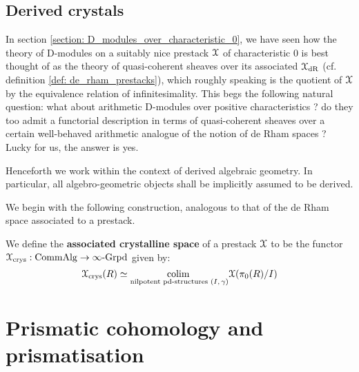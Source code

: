     \subsection{Derived crystals}
        In section \ref{section: D_modules_over_characteristic_0}, we have seen how the theory of D-modules on a suitably nice prestack $\mathcal{X}$ of characteristic $0$ is best thought of as the theory of quasi-coherent sheaves over its associated  $\mathcal{X}_{\mathrm{dR}}$ (cf. definition \ref{def: de_rham_prestacks}), which roughly speaking is the quotient of $\mathcal{X}$ by the equivalence relation of infinitesimality. This begs the following natural question: what about arithmetic D-modules over positive characteristics ? do they too admit a functorial description in terms of quasi-coherent sheaves over a certain well-behaved arithmetic analogue of the notion of de Rham spaces ? Lucky for us, the answer is yes.
            
        \begin{convention}
            Henceforth we work within the context of derived algebraic geometry. In particular, all algebro-geometric objects shall be implicitly assumed to be derived.
        \end{convention}
        
        We begin with the following construction, analogous to that of the de Rham space associated to a prestack.
        \begin{definition} \label{def: crystalline_space}
            We define the \textbf{associated crystalline space} of a prestack $\mathcal{X}$ to be the functor $\mathcal{X}_{\mathrm{crys}}: \mathrm{Comm}\mathrm{Alg} \to \infty\text{-}\mathrm{Grpd}$ given by:
                $$\mathcal{X}_{\mathrm{crys}}(R) \simeq \underset{\text{nilpotent pd-structures $(I, \gamma)$}}{\operatorname{colim} \:} \mathcal{X}(\pi_0(R)/I)$$
        \end{definition}
    



    
\section{Prismatic cohomology and prismatisation}
